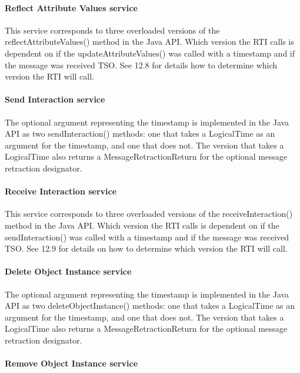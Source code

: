 \begin{compactstdpage}
    \paragraph{Reflect Attribute Values \rtiinitiated{} service}

    This service corresponds to three overloaded versions of the reflectAttributeValues() method in the Java API. Which version the RTI calls is dependent on if the updateAttributeValues() was called with a timestamp and if the message was received TSO. See 12.8 for details how to determine which version the RTI will call.

    \paragraph{Send Interaction service}

    The optional argument representing the timestamp is implemented in the Java API as two sendInteraction() methods: one that takes a LogicalTime as an argument for the timestamp, and one that does not. The version that takes a LogicalTime also returns a MessageRetractionReturn for the optional message retraction designator.

    \paragraph{Receive Interaction \rtiinitiated{} service}

    This service corresponds to three overloaded versions of the receiveInteraction() method in the Java API. Which version the RTI calls is dependent on if the sendInteraction() was called with a timestamp and if the message was received TSO. See 12.9 for details on how to determine which version the RTI will call.

    \paragraph{Delete Object Instance service}

    The optional argument representing the timestamp is implemented in the Java API as two deleteObjectInstance() methods: one that takes a LogicalTime as an argument for the timestamp, and one that does not. The version that takes a LogicalTime also returns a MessageRetractionReturn for the optional message retraction designator.

    \paragraph{Remove Object Instance \rtiinitiated{} service}


\end{compactstdpage}
